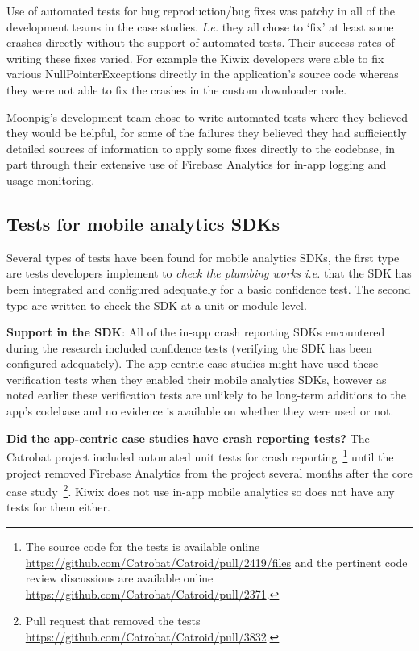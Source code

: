 Use of automated tests for bug reproduction/bug fixes was patchy in all of the development teams in the case studies. \emph{I.e.} they all chose to `fix' at least some crashes directly without the support of automated tests. Their success rates of writing these fixes varied. For example the Kiwix developers were able to fix various NullPointerExceptions directly in the application's source code whereas they were not able to fix the crashes in the custom downloader code. 

Moonpig's development team chose to write automated tests where they believed they would be helpful, for some of the failures they believed they had sufficiently detailed sources of information to apply some fixes directly to the codebase, in part through their extensive use of Firebase Analytics for in-app logging and usage monitoring.



\subsection{Tests for mobile analytics SDKs}
Several types of tests have been found for mobile analytics SDKs, the first type are tests developers implement to \textit{check the plumbing works i.e.} that the SDK has been integrated and configured adequately for a basic confidence test. The second type are written to check the SDK at a unit or module level.

\textbf{Support in the SDK}: 
All of the in-app crash reporting SDKs encountered during the research included confidence tests (verifying the SDK has been configured adequately). The app-centric case studies might have used these verification tests when they enabled their mobile analytics SDKs, however as noted earlier these verification tests are unlikely to be long-term additions to the app's codebase and no evidence is available on whether they were used or not. 

\textbf{Did the app-centric case studies have crash reporting tests?} 
The Catrobat project included automated unit tests for crash reporting~\footnote{The source code for the tests is available online \url{https://github.com/Catrobat/Catroid/pull/2419/files} and the pertinent code review discussions are available online \url{https://github.com/Catrobat/Catroid/pull/2371}.} until the project removed Firebase Analytics from the project several months after the core case study~\footnote{Pull request that removed the tests \url{https://github.com/Catrobat/Catroid/pull/3832}.}. Kiwix does not use in-app mobile analytics so does not have any tests for them either. 

